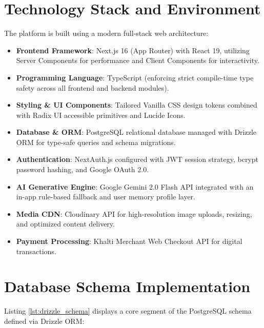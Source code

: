 \documentclass[12pt,a4paper]{report}
\begin{document}
\section{Technology Stack and Environment}
The platform is built using a modern full-stack web architecture:
\begin{itemize}
    \item \textbf{Frontend Framework}: Next.js 16 (App Router) with React 19, utilizing Server Components for performance and Client Components for interactivity.
    \item \textbf{Programming Language}: TypeScript (enforcing strict compile-time type safety across all frontend and backend modules).
    \item \textbf{Styling \& UI Components}: Tailored Vanilla CSS design tokens combined with Radix UI accessible primitives and Lucide Icons.
    \item \textbf{Database \& ORM}: PostgreSQL relational database managed with Drizzle ORM for type-safe queries and schema migrations.
    \item \textbf{Authentication}: NextAuth.js configured with JWT session strategy, bcrypt password hashing, and Google OAuth 2.0.
    \item \textbf{AI Generative Engine}: Google Gemini 2.0 Flash API integrated with an in-app rule-based fallback and user memory profile layer.
    \item \textbf{Media CDN}: Cloudinary API for high-resolution image uploads, resizing, and optimized content delivery.
    \item \textbf{Payment Processing}: Khalti Merchant Web Checkout API for digital transactions.
\end{itemize}

\section{Database Schema Implementation}
Listing \ref{lst:drizzle_schema} displays a core segment of the PostgreSQL schema defined via Drizzle ORM:
\end{document}
